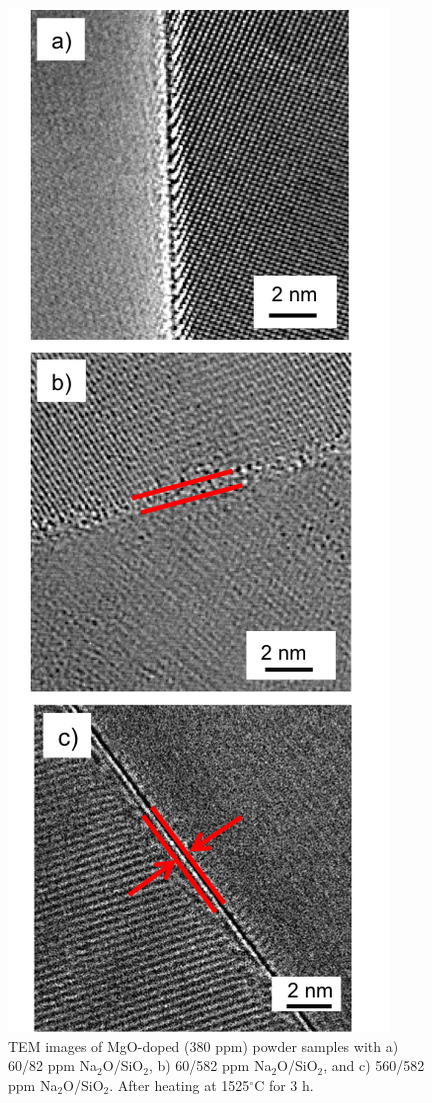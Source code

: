 \newpage
\begin{figure}[H]
	\centering
	\includegraphics{Chapter-4/Figures/Figure10.png}
	\caption{TEM images of MgO-doped (380 ppm) powder samples with a) 60/82 ppm Na$_{2}$O/SiO$_{2}$, b) 60/582 ppm Na$_{2}$O/SiO$_{2}$, and c) 560/582 ppm Na$_{2}$O/SiO$_{2}$. After heating at 1525$^{\circ}$C for 3 h.}
	\label{Ch4-figure:Figure10}
\end{figure}
